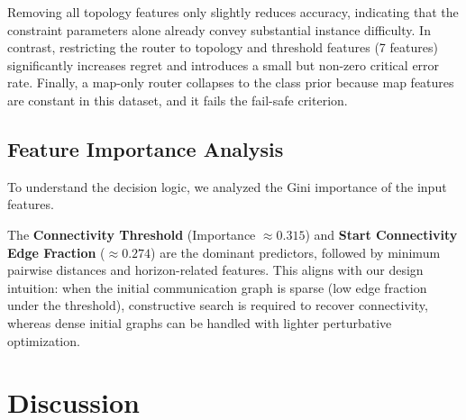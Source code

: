 \documentclass[conference]{IEEEtran}
\begin{document}
\begin{table}[t]
\centering
\caption{Router ablations on the test set ($N=1836$).}
\label{tab:router_ablations}
\small
\setlength{\tabcolsep}{3.5pt}
\end{table}

Removing all topology features only slightly reduces accuracy, indicating that the constraint parameters alone already convey substantial instance difficulty. In contrast, restricting the router to topology and threshold features (7 features) significantly increases regret and introduces a small but non-zero critical error rate. Finally, a map-only router collapses to the class prior because map features are constant in this dataset, and it fails the fail-safe criterion.

\subsection{Feature Importance Analysis}
To understand the decision logic, we analyzed the Gini importance of the input features. 


The \textbf{Connectivity Threshold} (Importance $\approx 0.315$) and \textbf{Start Connectivity Edge Fraction} ($\approx 0.274$) are the dominant predictors, followed by minimum pairwise distances and horizon-related features. This aligns with our design intuition: when the initial communication graph is sparse (low edge fraction under the threshold), constructive search is required to recover connectivity, whereas dense initial graphs can be handled with lighter perturbative optimization.


\section{Discussion}
\label{sec:discussion}
\end{document}

